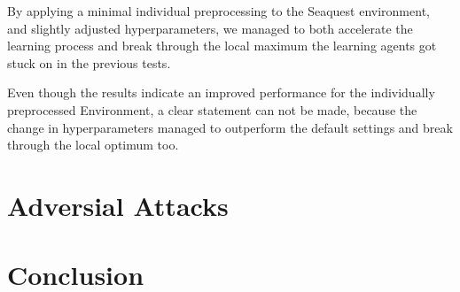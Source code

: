 By applying a minimal individual preprocessing to the Seaquest environment, and slightly adjusted hyperparameters, we managed to both accelerate the learning process and break through the local maximum the learning agents got stuck on in the previous tests.

Even though the results indicate an improved performance for the individually preprocessed Environment, a clear statement can not be made, because the change in hyperparameters managed to outperform the default settings and break through the local optimum too.

\section{Adversial Attacks}

\section{Conclusion}